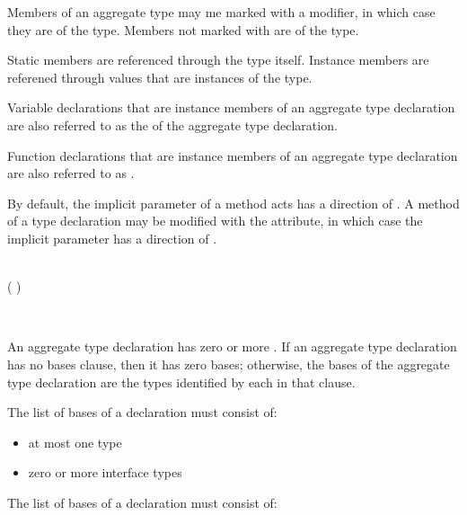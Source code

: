 
Members of an aggregate type may me marked with a  modifier, in which case they are  of the type.
Members not marked with  are  of the type.

Static members are referenced through the type itself.
Instance members are referened through values that are instances of the type.


Variable declarations that are instance members of an aggregate type declaration are also referred to as the  of the aggregate type declaration.


Function declarations that are instance members of an aggregate type declaration are also referred to as .

By default, the implicit  parameter of a method acts has a direction of .
A method of a  type declaration may be modified with the \code{[mutating]} attribute, in which case the implicit  parameter has a direction of .


\begin{Syntax}
     \\
        \code{:}  (\code{,} )\SynStar

     \\
\end{Syntax}

An aggregate type declaration has zero or more .
If an aggregate type declaration has no bases clause, then it has zero bases;
otherwise, the bases of the aggregate type declaration are the types identified by each  in that clause.

The list of bases of a  declaration must consist of:

\begin{itemize}
\item at most one  type
\item zero or more interface types
\end{itemize}


The list of bases of a  declaration must consist of:

